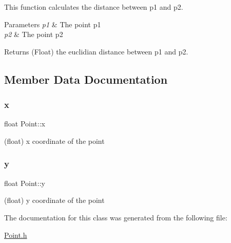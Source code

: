 This function calculates the distance between p1 and p2. 


\begin{DoxyParams}{Parameters}
{\em p1} & The point p1 \\
\hline
{\em p2} & The point p2\\
\hline
\end{DoxyParams}
\begin{DoxyReturn}{Returns}
(Float) the euclidian distance between p1 and p2. 
\end{DoxyReturn}


\subsection{Member Data Documentation}
\mbox{\label{struct_point_a05dfe2dfbde813ad234b514f30e662f1}} 
\subsubsection{\texorpdfstring{x}{x}}
{\footnotesize\ttfamily float Point\+::x}

(float) x coordinate of the point \mbox{\label{struct_point_a6101960c8d2d4e8ea1d32c9234bbeb8d}} 
\subsubsection{\texorpdfstring{y}{y}}
{\footnotesize\ttfamily float Point\+::y}

(float) y coordinate of the point 

The documentation for this class was generated from the following file\+:\begin{DoxyCompactItemize}
\item 
\mbox{\hyperlink{_point_8h}{Point.\+h}}\end{DoxyCompactItemize}
